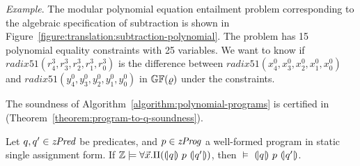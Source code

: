 \noindent
\emph{Example}.
The modular polynomial equation entailment problem corresponding to the
algebraic specification of subtraction is shown in
Figure~\ref{figure:translation:subtraction-polynomial}. The problem
has 15 polynomial equality constraints with 25 variables. We
want to know if $\mathit{radix51}({r}^3_4, {r}^3_3, {r}^3_2,
{r}^3_1, {r}^3_0)$ is the difference between $\mathit{radix51}({x}^0_4,
{x}^0_3, {x}^0_2, {x}^0_1, {x}^0_0)$ and $\mathit{radix51}({y}^0_4,
{y}^0_3, {y}^0_2, {y}^0_1, {y}^0_0)$ in $\mathbb{GF}(\varrho)$ under the
constraints.

The soundness of Algorithm~\ref{algorithm:polynomial-programs}
is certified in \coq (Theorem~\ref{theorem:program-to-q-soundness}).
\begin{theorem}
  \label{theorem:program-to-q-soundness}
  Let $q, q' \in \mathit{zPred}$ be predicates, and $p \in \mathit{zProg}$ a well-formed
  program in static single assignment form.
  If $\mathbb{Z} \models \forall \vec{x}.\Pi({(\!|}{q}{|\!)}~{p}~{(\!|}{q'}{|\!)})$, then
  $\models$ ${(\!|}{q}{|\!)}~{p}~{(\!|}{q'}{|\!)}$.
\end{theorem}
